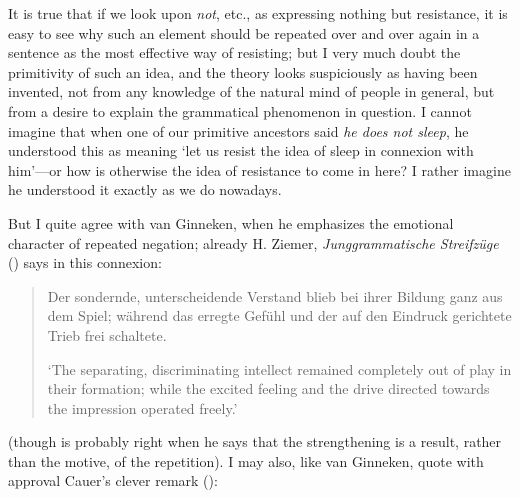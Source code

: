 \noindent It is true that if we look upon \textit{not}, etc., as expressing nothing but resistance, it is easy to see why such an element should be repeated over and over again in a sentence as the most effective way of resisting; but I very much doubt the primitivity of such an idea, and the theory looks suspiciously as having been invented, not from any knowledge of the natural mind of people in general, but from a desire to explain the grammatical phenomenon in question. I cannot imagine that when one of our primitive ancestors said \textit{he does not sleep}, he understood this as meaning `let us resist the idea of sleep in connexion with him'---or how is otherwise %
the idea of resistance to come in here? I rather imagine he understood it exactly as we do nowadays.

But I quite agree with van Ginneken, when he emphasizes the emotional character of repeated negation; already H. Ziemer, \textit{Junggrammatische Streifzüge} (\citeyear[\href{https://archive.org/details/junggrammatisch00ziemgoog/page/n163/mode/2up?view=theater\&q=\%22Der+sondernde\%22}{142}]{ziemer1883junggrammatische}) %
says in this connexion:

\begin{quote}
Der sondernde, unterscheidende Verstand blieb bei ihrer Bildung ganz aus dem Spiel; während das erregte Gefühl und der auf den Eindruck gerichtete Trieb frei schaltete.

`The separating, discriminating intellect remained completely out of play in their formation; while the excited feeling and the drive directed towards the impression operated freely.' %
\end{quote}

\noindent (though \citet{mourek1902ueber} is probably right when he says that the strengthening is a result, rather than the motive, of the repetition). I may also, like van Ginneken, quote with approval Cauer's clever remark (\citeyear[\href{https://archive.org/details/grammaticamilit00cauegoog/page/50/mode/2up?q=\%22zugleich+vor+und+in+der+klammer\%22&view=theater}{50}]{cauer1903grammatica}): %

